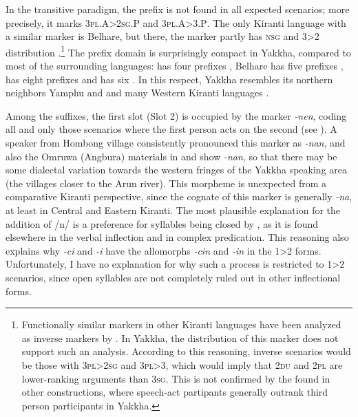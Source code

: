 In the transitive paradigm, the prefix is not found in all expected scenarios; more precisely, it  marks {\scshape 3pl.A>2sg.P} and {\scshape 3pl.A>3.P}. The only Kiranti language with a similar marker is Belhare, but there, the marker partly has {\scshape nsg} and 3>2 distribution \citep[551]{Bickel2003Belhare}.\footnote{Functionally similar  markers in other Kiranti languages have been analyzed as inverse markers by \citet{Ebert1991Inverse}. In Yakkha, the distribution of this marker does not support such an analysis. According to this reasoning, inverse scenarios would be those with {\scshape 3pl>2sg} and {\scshape 3pl>3}, which would imply that {\scshape 2du} and {\scshape 2pl} are lower-ranking arguments than {\scshape 3sg}. This is not confirmed by the  found in other constructions, where speech-act partipants generally outrank third person participants in Yakkha.} The prefix domain is surprisingly compact in Yakkha, compared to most of the surrounding languages:  has four prefixes \citep{Driem1997A-new-analysis}, Belhare has five prefixes \citep{Bickel2003Belhare},  has eight prefixes \citep{Schikowski2012_Morphology} and  has six \citep{Doornenbal2009A-grammar}. In this respect, Yakkha resembles its northern neighbors  Yamphu and  \citep{Rutgers1998Yamphu, Tolsma1999A-grammar} and many Western Kiranti languages \citep[93]{Jacques2012_Agreement}. 

 
Among the suffixes, the first  slot (Slot 2) is occupied by the marker \emph{-nen}, coding all and only those scenarios where  the first person acts on the second  (see \Next). A speaker from Hombong  village consistently pronounced this marker as \emph{-nan}, and also the Omruwa (Angbura) materials in \citet{Driem1994The-Yakkha} and  \citet{Gvozdanovic1987How} show \emph{-nan}, so that there may be some dialectal variation towards the western fringes of the Yakkha speaking area (the villages closer to the Arun river). This morpheme is unexpected from a comparative Kiranti perspective, since the cognate of this marker is generally  \emph{-na}, at least in Central and Eastern Kiranti. The most plausible explanation for the addition of /n/ is  a preference for  syllables being closed by , as it is found elsewhere in the verbal inflection and in complex predication. This reasoning also explains why \emph{-ci} and \emph{-i} have the allomorphs \emph{-cin} and \emph{-in} in the 1>2 forms.  Unfortunately, I have no explanation for why such a process is  restricted to 1>2 scenarios, since open syllables are not completely ruled out in other inflectional forms.


